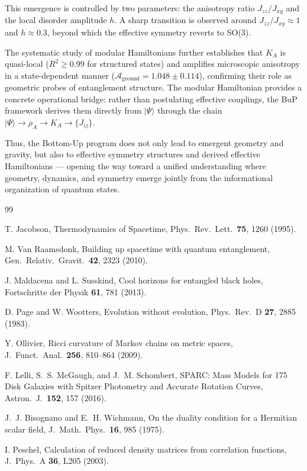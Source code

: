 \documentclass[11pt]{article}
\begin{document}
This emergence is controlled by two parameters: the anisotropy ratio
$J_{zz}/J_{xy}$ and the local disorder amplitude $h$. A sharp
transition is observed around $J_{zz}/J_{xy} \approx 1$ and
$h \approx 0.3$, beyond which the effective symmetry reverts to SO(3).

The systematic study of modular Hamiltonians further establishes that
$K_A$ is quasi-local ($R^2 \geq 0.99$ for structured states) and
amplifies microscopic anisotropy in a state-dependent manner
($\mathcal{A}_{\mathrm{ground}} = 1.048 \pm 0.114$), confirming
their role as geometric probes of entanglement structure. The
modular Hamiltonian provides a concrete operational bridge: rather
than postulating effective couplings, the BuP framework derives them
directly from $|\Psi\rangle$ through the chain
$|\Psi\rangle \to \rho_A \to K_A \to \{J_{ij}\}$.

Thus, the Bottom-Up program does not only lead to emergent geometry
and gravity, but also to effective symmetry structures and derived
effective Hamiltonians --- opening the way toward a unified
understanding where geometry, dynamics, and symmetry emerge jointly
from the informational organization of quantum states.

\begin{thebibliography}{99}

T. Jacobson,
Thermodynamics of Spacetime,
Phys.\ Rev.\ Lett.\ \textbf{75}, 1260 (1995).

M. Van Raamsdonk,
Building up spacetime with quantum entanglement,
Gen.\ Relativ.\ Gravit.\ \textbf{42}, 2323 (2010).

J. Maldacena and L. Susskind,
Cool horizons for entangled black holes,
Fortschritte der Physik \textbf{61}, 781 (2013).

D. Page and W. Wootters,
Evolution without evolution,
Phys.\ Rev.\ D \textbf{27}, 2885 (1983).

Y. Ollivier,
Ricci curvature of Markov chains on metric spaces,
J.\ Funct.\ Anal.\ \textbf{256}, 810--864 (2009).

F. Lelli, S.~S. McGaugh, and J.~M. Schombert,
SPARC: Mass Models for 175 Disk Galaxies with Spitzer Photometry
and Accurate Rotation Curves,
Astron.\ J.\ \textbf{152}, 157 (2016).

J.~J. Bisognano and E.~H. Wichmann,
On the duality condition for a Hermitian scalar field,
J.~Math.~Phys.\ \textbf{16}, 985 (1975).

I. Peschel,
Calculation of reduced density matrices from correlation functions,
J.~Phys.~A \textbf{36}, L205 (2003).

\end{thebibliography}
\end{document}
